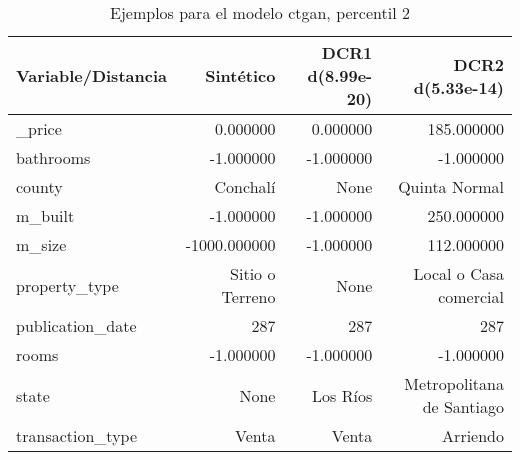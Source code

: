 \begin{table}[H]
\centering
\fontsize{10}{14}\selectfont
\caption{Ejemplos para el modelo ctgan, percentil 2}
\label{table-example-economicos-b-1-ctgan-2p}
\begin{tabular}{|l|r|r|r|}
\hline
\rowcolor[gray]{0.8}
Variable/Distancia & Sintético & DCR1 d(8.99e-20) & DCR2 d(5.33e-14) \\
\hline \_price & \cellcolor[rgb]{0.9, 0.54, 0.52} 0.000000 & \cellcolor[rgb]{0.9, 0.54, 0.52} 0.000000 & 185.000000 \\
\hline bathrooms & \cellcolor[rgb]{0.9, 0.54, 0.52} -1.000000 & \cellcolor[rgb]{0.9, 0.54, 0.52} -1.000000 & \cellcolor[rgb]{0.9, 0.54, 0.52} -1.000000 \\
\hline county & \cellcolor[rgb]{0.9, 0.54, 0.52} Conchalí & None & Quinta Normal \\
\hline m\_built & \cellcolor[rgb]{0.9, 0.54, 0.52} -1.000000 & \cellcolor[rgb]{0.9, 0.54, 0.52} -1.000000 & 250.000000 \\
\hline m\_size & \cellcolor[rgb]{0.9, 0.54, 0.52} -1000.000000 & \cellcolor[rgb]{0.9, 0.54, 0.52} -1.000000 & 112.000000 \\
\hline property\_type & \cellcolor[rgb]{0.9, 0.54, 0.52} Sitio o Terreno & None & Local o Casa comercial \\
\hline publication\_date & \cellcolor[rgb]{0.9, 0.54, 0.52} 287 & \cellcolor[rgb]{0.9, 0.54, 0.52} 287 & \cellcolor[rgb]{0.9, 0.54, 0.52} 287 \\
\hline rooms & \cellcolor[rgb]{0.9, 0.54, 0.52} -1.000000 & \cellcolor[rgb]{0.9, 0.54, 0.52} -1.000000 & \cellcolor[rgb]{0.9, 0.54, 0.52} -1.000000 \\
\hline state & \cellcolor[rgb]{0.9, 0.54, 0.52} None & Los Ríos & Metropolitana de Santiago \\
\hline transaction\_type & \cellcolor[rgb]{0.9, 0.54, 0.52} Venta & \cellcolor[rgb]{0.9, 0.54, 0.52} Venta & Arriendo \\
\hline
\end{tabular}
\end{table}
